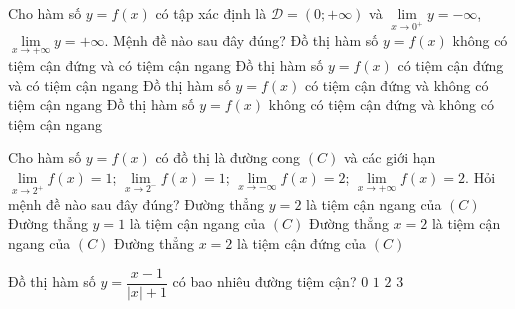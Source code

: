 \begin{ex}%
	Cho hàm số $y=f(x)$ có tập xác định là $\mathscr{D}=(0;+\infty)$ và $\lim\limits_{x\to 0^+} y=-\infty$, $\lim\limits_{x\to+\infty} y=+\infty$. Mệnh đề nào sau đây đúng?
	\choice
	{Đồ thị hàm số $y=f(x)$ không có tiệm cận đứng và có tiệm cận ngang}
	{Đồ thị hàm số $y=f(x)$ có tiệm cận đứng và có tiệm cận ngang}
	{\True Đồ thị hàm số $y=f(x)$ có tiệm cận đứng và không có tiệm cận ngang}
	{Đồ thị hàm số $y=f(x)$ không có tiệm cận đứng và không có tiệm cận ngang}
\end{ex}
\begin{ex}%
	Cho hàm số $y=f(x)$ có đồ thị là đường cong $(C)$ và các giới hạn $\lim\limits_{x\to 2^+} f(x)=1$; $\lim\limits_{x\to 2^-} f(x)=1$; $\lim\limits_{x\to-\infty} f(x)=2$; $\lim\limits_{x\to+\infty} f(x)=2$. Hỏi mệnh đề nào sau đây đúng?
	\choice
	{\True Đường thẳng $y=2$ là tiệm cận ngang của $(C)$}
	{Đường thẳng $y=1$ là tiệm cận ngang của $(C)$}
	{Đường thẳng $x=2$ là tiệm cận ngang của $(C)$}
	{Đường thẳng $x=2$ là tiệm cận đứng của $(C)$}
\end{ex}
\begin{ex}%
	Đồ thị hàm số $y=\dfrac{x-1}{|x|+1}$ có bao nhiêu đường tiệm cận?
	\choice
	{$0$}
	{$1$}
	{\True $2$}
	{$3$}
\end{ex}
